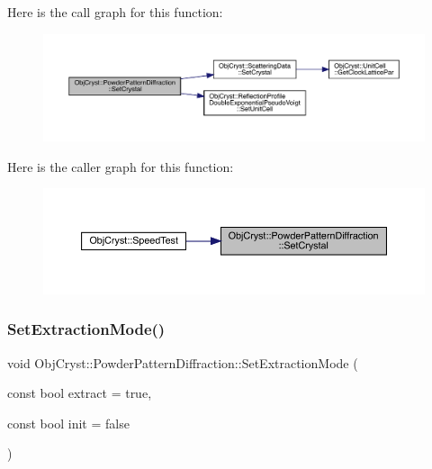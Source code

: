 Here is the call graph for this function\+:
\nopagebreak
\begin{figure}[H]
\begin{center}
\leavevmode
\includegraphics[width=350pt]{class_obj_cryst_1_1_powder_pattern_diffraction_a5e32e21896fdd947add0cc47fad0bc87_cgraph}
\end{center}
\end{figure}
Here is the caller graph for this function\+:
\nopagebreak
\begin{figure}[H]
\begin{center}
\leavevmode
\includegraphics[width=350pt]{class_obj_cryst_1_1_powder_pattern_diffraction_a5e32e21896fdd947add0cc47fad0bc87_icgraph}
\end{center}
\end{figure}
\mbox{\label{class_obj_cryst_1_1_powder_pattern_diffraction_a02f1293bc57c472a85741a328521d95f}} 
\subsubsection{\texorpdfstring{SetExtractionMode()}{SetExtractionMode()}}
{\footnotesize\ttfamily void Obj\+Cryst\+::\+Powder\+Pattern\+Diffraction\+::\+Set\+Extraction\+Mode (\begin{DoxyParamCaption}\item[{const bool}]{extract = {\ttfamily true},  }\item[{const bool}]{init = {\ttfamily false} }\end{DoxyParamCaption})}

